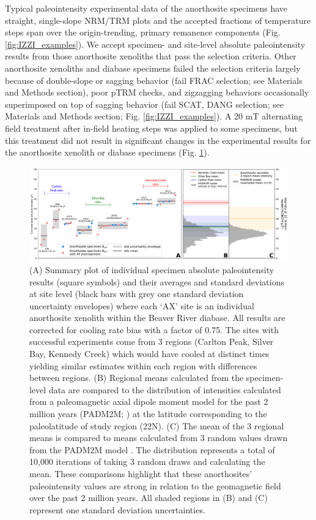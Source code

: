 Typical paleointensity experimental data of the anorthosite specimens have straight, single-slope NRM/TRM plots and the accepted fractions of temperature steps span over the origin-trending, primary remanence components (Fig. \ref{fig:IZZI_examples}). We accept specimen- and site-level absolute paleointensity results from those anorthosite xenoliths that pass the selection criteria. Other anorthosite xenoliths and diabase specimens failed the selection criteria largely because of double-slope or sagging behavior (fail FRAC selection; see Materials and Methods section), poor pTRM checks, and zigzagging behaviors occasionally superimposed on top of sagging behavior (fail SCAT, DANG selection; see Materials and Methods section; Fig. \ref{fig:IZZI_examples}). A 20 mT alternating field treatment after in-field heating steps was applied to some specimens, but this treatment did not result in significant changes in the experimental results for the anorthosite xenolith or diabase specimens (Fig. \ref{fig:PINT_cooling_corrected}). 

\begin{figure}[h!]
\noindent\includegraphics[width=\textwidth]{figure/Zhang2022/Paleointensity_plot_cooling_corrected.pdf}
\centering
\caption{\footnotesize{(A) Summary plot of individual specimen absolute paleointensity results (square symbols) and their averages and standard deviations at site level (black bars with grey one standard deviation uncertainty envelopes) where each `AX' site is an individual anorthosite xenolith within the Beaver River diabase. All results are corrected for cooling rate bias with a factor of 0.75. The sites with successful experiments come from 3 regions (Carlton Peak, Silver Bay, Kennedy Creek) which would have cooled at distinct times yielding similar estimates within each region with differences between regions. (B) Regional means calculated from the specimen-level data are compared to the distribution of intensities calculated from a paleomagnetic axial dipole moment model for the past 2 million years (PADM2M; \citealp{Ziegler2011a}) at the latitude corresponding to the paleolatitude of study region (22\textdegree N). (C) The mean of the 3 regional means is compared to means calculated from 3 random values drawn from the PADM2M model \citep{Ziegler2011a}. The distribution represents a total of 10,000 iterations of taking 3 random draws and calculating the mean. These comparisons highlight that these anorthosites' paleointensity values are strong in relation to the geomagnetic field over the past 2 million years. All shaded regions in (B) and (C) represent one standard deviation uncertainties.}}
\label{fig:PINT_cooling_corrected}
\end{figure}

